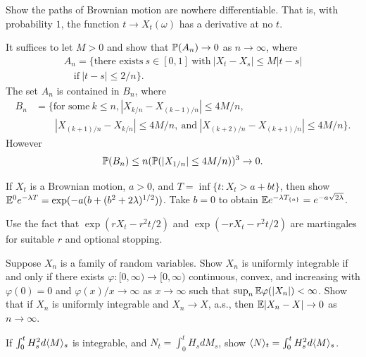 \begin{exercise}\label{ex:ch1_19}
Show the paths of Brownian motion are nowhere differentiable. That is, with probability $1$, the function $t \to X_t(\omega)$ has a derivative at no $t$.

\hint It suffices to let $M > 0$ and show that $\P(A_n) \to 0$ as $n \to \infty$, where
\begin{gather*}
    A_n = \{\text{there exists}~s \in [0,1]~\text{with}~|X_t - X_s| \leq M|t-s| \\
    \quad\text{if}~|t-s| \leq 2/n\}.
\end{gather*}
The set $A_n$ is contained in $B_n$, where
\begin{align*}
    B_n &= \{\text{for some}~k \leq n, |X_{k/n} - X_{(k-1)/n}| \leq 4M/n, \\
    &\qquad |X_{(k+1)/n} - X_{k/n}| \leq 4M/n,~\text{and}~|X_{(k+2)/n} - X_{(k+1)/n}| \leq 4M/n\}.
\end{align*}
However
\[
    \P(B_n) \leq n(\P(|X_{1/n}| \leq 4M/n))^3 \to 0.
\]
\end{exercise}

\begin{exercise}\label{ex:ch1_20}
If $X_t$ is a Brownian motion, $a > 0$, and $T = \inf\{t : X_t > a+bt\}$, then show $\E^0 e^{-\lambda T} = \exp(-a(b + (b^2 + 2\lambda)^{1/2}))$. Take $b = 0$ to obtain $\E e^{-\lambda T_{\{a\}}} = e^{-a\sqrt{2\lambda}}$.

\hint Use the fact that $\exp(rX_t - r^2t/2)$ and $\exp(-rX_t - r^2t/2)$ are martingales for suitable $r$ and optional stopping.
\end{exercise}

\begin{exercise}\label{ex:ch1_21}
Suppose $X_n$ is a family of random variables. Show $X_n$ is uniformly integrable if and only if there exists $\varphi : [0,\infty) \to [0,\infty)$ continuous, convex, and increasing with $\varphi(0) = 0$ and $\varphi(x)/x \to \infty$ as $x \to \infty$ such that $\sup_n \E \varphi(|X_n|) < \infty$. Show that if $X_n$ is uniformly integrable and $X_n \to X$, a.s., then $\E|X_n - X| \to 0$ as $n \to \infty$.
\end{exercise}

\begin{exercise}\label{ex:ch1_22}
If $\int_0^t H_s^2 d\lrang{M}_s$ is integrable, and $N_t = \int_0^t H_s dM_s$, show $\lrang{N}_t = \int_0^t H_s^2 d\lrang{M}_s$.
\end{exercise}

